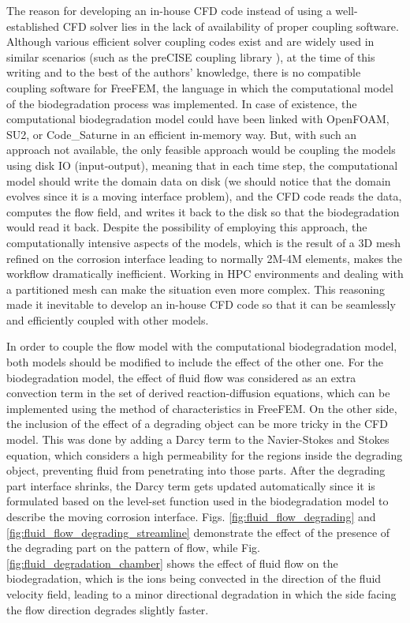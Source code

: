 The reason for developing an in-house {CFD} code instead of using a well-established {CFD} solver lies in the lack of availability of proper coupling software. Although various efficient solver coupling codes exist and are widely used in similar scenarios (such as the preCISE coupling library \cite{preCICEv2}), at the time of this writing and to the best of the authors' knowledge, there is no compatible coupling software for FreeFEM, the language in which the computational model of the biodegradation process was implemented. In case of existence, the computational biodegradation model could have been linked with OpenFOAM, SU2, or Code\_Saturne in an efficient in-memory way. But, with such an approach not available, the only feasible approach would be coupling the models using disk {IO} (input-output), meaning that in each time step, the computational model should write the domain data on disk (we should notice that the domain evolves since it is a moving interface problem), and the {CFD} code reads the data, computes the flow field, and writes it back to the disk so that the biodegradation would read it back. Despite the possibility of employing this approach, the computationally intensive aspects of the models, which is the result of a 3D mesh refined on the corrosion interface leading to normally 2M-4M elements, makes the workflow dramatically inefficient. Working in {HPC} environments and dealing with a partitioned mesh can make the situation even more complex. This reasoning made it inevitable to develop an in-house {CFD} code so that it can be seamlessly and efficiently coupled with other models.

In order to couple the flow model with the computational biodegradation model, both models should be modified to include the effect of the other one. For the biodegradation model, the effect of fluid flow was considered as an extra convection term in the set of derived reaction-diffusion equations, which can be implemented using the method of characteristics in FreeFEM. On the other side, the inclusion of the effect of a degrading object can be more tricky in the {CFD} model. This was done by adding a Darcy term to the Navier-Stokes and Stokes equation, which considers a high permeability for the regions inside the degrading object, preventing fluid from penetrating into those parts. After the degrading part interface shrinks, the Darcy term gets updated automatically since it is formulated based on the level-set function used in the biodegradation model to describe the moving corrosion interface. Figs. \ref{fig:fluid_flow_degrading} and \ref{fig:fluid_flow_degrading_streamline} demonstrate the effect of the presence of the degrading part on the pattern of flow, while Fig.
\ref{fig:fluid_degradation_chamber} shows the effect of fluid flow on the biodegradation, which is the ions being convected in the direction of the fluid velocity field, leading to a minor directional degradation in which the side facing the flow direction degrades slightly faster.

